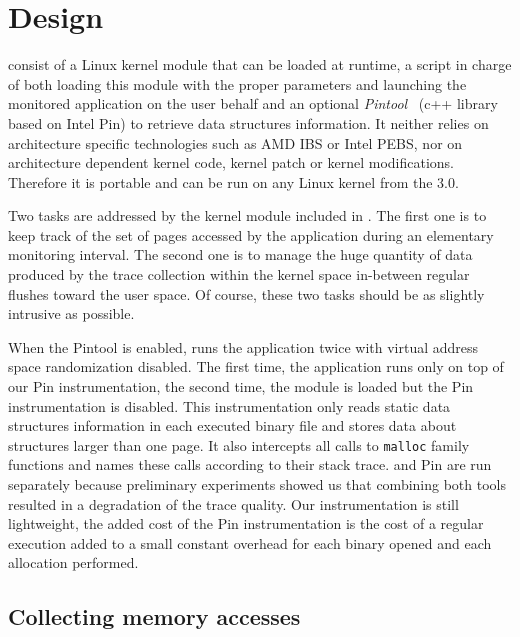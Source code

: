 \section{Design}
\label{sec:design}

\Moca consist of a Linux kernel module that can be loaded at runtime,  a script
in charge of both loading this module with the proper parameters and launching the
monitored application on the user behalf
and an optional \emph{Pintool}~\cite{Luk05Pin} (c++ library based on Intel Pin) to retrieve data
structures information.
It neither relies on architecture specific
technologies such as AMD IBS or Intel PEBS, nor on architecture dependent kernel
code, kernel patch or kernel modifications.
Therefore it is portable and can be run on any Linux kernel
from the $3.0$.

Two tasks are addressed by the kernel module included in \Moca. The first one is
to keep track of the set of pages accessed by the application during an elementary monitoring
interval. The second one is to manage the huge quantity of data produced
by the trace collection within the kernel space in-between regular flushes toward
the user space. Of course, these two tasks should be as slightly intrusive as possible.

When the Pintool is enabled, \Moca runs the application twice with virtual
address space randomization disabled. The first time, the application runs only
on top of our Pin instrumentation, the second time, the \Moca module is loaded but the
Pin instrumentation is disabled. This instrumentation only reads static data
structures information in each executed binary file and stores data about structures larger than
one page. It also intercepts all calls to \texttt{malloc} family functions
and names these calls according to their stack trace.
\Moca and Pin are run separately because preliminary experiments showed us that combining both
tools resulted in a degradation of the trace quality. Our instrumentation is still lightweight, the
added cost of the Pin instrumentation is the cost of a regular execution 
added to a small constant overhead for each binary opened and each allocation performed.

\subsection{Collecting memory accesses}

